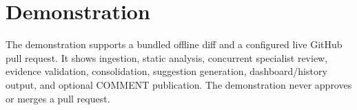 \documentclass[11pt,a4paper]{article}
\begin{document}
\section{Demonstration}
The demonstration supports a bundled offline diff and a configured live GitHub pull request. It shows ingestion, static analysis, concurrent specialist review, evidence validation, consolidation, suggestion generation, dashboard/history output, and optional COMMENT publication. The demonstration never approves or merges a pull request.
\end{document}

